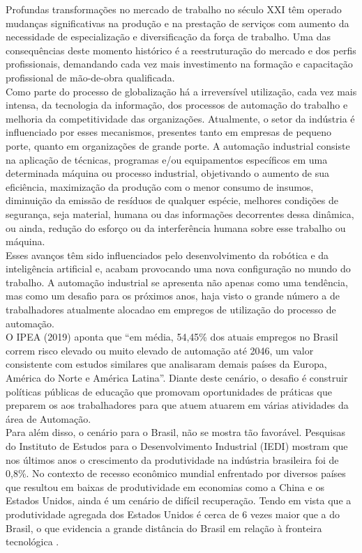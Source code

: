 Profundas transformações no mercado de trabalho no século XXI têm operado mudanças significativas na produção e na prestação de serviços com aumento da necessidade de especialização e diversificação da força de trabalho. Uma das consequências deste momento histórico é a reestruturação do mercado e dos perfis profissionais, demandando cada vez mais investimento na formação e capacitação profissional de mão-de-obra qualificada.\\

Como parte do processo de globalização há a irreversível utilização, cada vez mais intensa, da tecnologia da informação, dos processos de automação do trabalho e melhoria da competitividade das organizações. Atualmente, o setor da indústria é influenciado por esses mecanismos, presentes tanto em empresas de pequeno porte, quanto em organizações de grande porte. A automação industrial  consiste na aplicação de técnicas, programas e/ou equipamentos específicos em uma determinada máquina ou processo industrial, objetivando o aumento de sua eficiência, maximização da produção com o menor consumo de insumos, diminuição da emissão de resíduos de qualquer espécie, melhores condições de segurança, seja material, humana ou das informações decorrentes dessa dinâmica, ou ainda, redução do esforço ou da interferência humana sobre esse trabalho ou máquina.\\

Esses avanços têm sido influenciados pelo desenvolvimento da robótica e da inteligência artificial e, acabam provocando uma nova configuração no mundo do trabalho. A automação industrial se apresenta não apenas como uma tendência, mas como um desafio para os próximos anos, haja visto o grande número a de trabalhadores atualmente alocadao em empregos de utilização do processo de automação.\\

O IPEA (2019) aponta que “em média, 54,45\% dos atuais empregos no Brasil correm risco elevado ou muito elevado de automação até 2046, um valor consistente com estudos similares que analisaram demais países da Europa, América do Norte e América Latina”. Diante deste cenário, o desafio é construir políticas públicas de educação que promovam oportunidades de práticas que preparem os aos trabalhadores para que atuem atuarem em várias atividades da área de Automação.\\

Para além disso, o cenário para o Brasil, não se mostra tão favorável. Pesquisas do Instituto de Estudos para o Desenvolvimento Industrial (IEDI) mostram que nos últimos anos o crescimento da produtividade na indústria brasileira foi de 0,8\%. No contexto de recesso econômico mundial enfrentado por diversos países que resultou em baixas de produtividade em economias como a China e os Estados Unidos, ainda é um cenário de difícil recuperação. Tendo em vista que a produtividade agregada dos Estados Unidos é cerca de 6 vezes maior que a do Brasil, o que evidencia a grande distância do Brasil em relação à fronteira tecnológica \cite{IEDI}.\\

